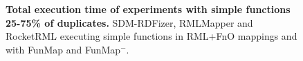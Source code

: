 \begin{figure}[t!]
{            \label{fig:vera25_rocketrml}}
\caption[Execution time with simple functions 25-75\% of duplicates]{{\bf Total execution time of experiments with simple functions 25-75\% of duplicates.} SDM-RDFizer, RMLMapper and RocketRML executing simple functions in RML+FnO mappings and with FunMap and FunMap$^-$.}
    \label{fig:exp-simple}
\end{figure}


